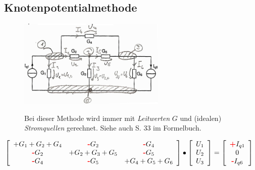 \subsection{Knotenpotentialmethode}
\begin{figure}[ht]
  \begin{minipage}[lt]{7 cm}
    \includegraphics[width=7cm]{pics/dcnet/knotenpotentialmethode} 
  \end{minipage}
  \begin{minipage}[rt]{9.35 cm} %
  Bei dieser Methode wird immer mit \textit{Leitwerten} $G$ und (idealen) \textit{Stromquellen}
gerechnet. Siehe auch S. 33 im Formelbuch.
  \end{minipage}
\end{figure}

$\left[\begin{array}{ccc}
+G_1+G_2+G_4 &\text{\textbf{\textcolor{red}{-}}}G_2 &\text{\textbf{\textcolor{red}{-}}}G_4\\
\text{\textbf{\textcolor{red}{-}}}G_2 &+G_2+G_3+G_5
&\text{\textbf{\textcolor{red}{-}}}G_5\\ 
\text{\textbf{\textcolor{red}{-}}}G_4 &\text{\textbf{\textcolor{red}{-}}}G_5 &+G_4+G_5+G_6
\end{array}\right] \bullet 
\left[\begin{array}{l}U_1\\U_2\\U_3\end{array}\right] = 
\left[\begin{array}{c}\text{\textbf{\textcolor{red}{+}}}I_{q1}\\0\\
\text{\textbf{\textcolor{red}{-}}}I_{q6}\end{array}\right]$

